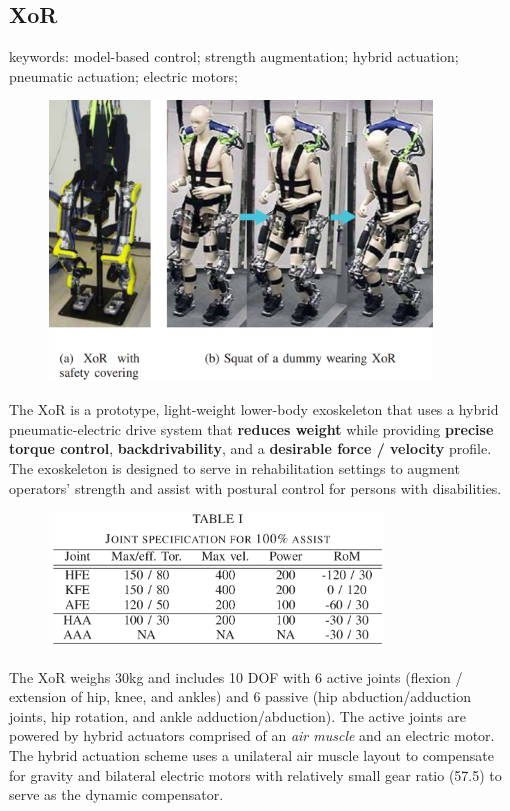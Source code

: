 \subsection{XoR}
\label{exo:XoR}

keywords: model-based control; strength augmentation; hybrid actuation; pneumatic actuation; electric motors;\\

\begin{figure}[ht]
  \centering
  \includegraphics[width=4.0in]{exos/figs/xor.png}
\end{figure}

The XoR is a prototype, light-weight lower-body exoskeleton that uses a hybrid pneumatic-electric drive system that \textbf{reduces weight} while providing \textbf{precise torque control}, \textbf{backdrivability}, and a \textbf{desirable force / velocity} profile.  The exoskeleton is designed to serve in rehabilitation settings to augment operators' strength and assist with postural control for persons with disabilities.

\begin{figure}[ht]
  \centering
  \includegraphics[width=3.5in]{exos/figs/xor_joint_rom.png}
\end{figure}

The XoR weighs 30kg and includes 10 DOF with 6 active joints (flexion / extension of hip, knee, and ankles) and 6 passive (hip abduction/adduction joints, hip rotation, and ankle adduction/abduction).  The active joints are powered by hybrid actuators comprised of an \emph{air muscle} and an electric motor.  The hybrid actuation scheme uses a unilateral air muscle layout to compensate for gravity and bilateral electric motors with relatively small gear ratio (57.5) to serve as the dynamic compensator.

